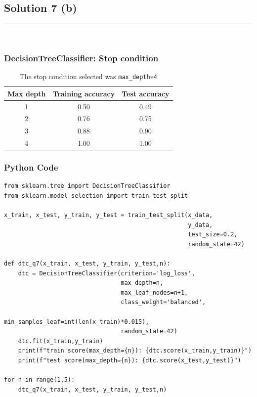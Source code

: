 \documentclass{article}
\begin{document}
\newpage

\subsection*{Solution 7 (b)}
\noindent\rule{\textwidth}{0.4pt}\\

\subsubsection*{DecisionTreeClassifier: Stop condition}
\begin{table}[h!]               
  \centering                    
  \begin{tabular}{|c|c|c|}
    \hline
    Max depth & Training accuracy & Test accuracy \\ \hline
    1 & 0.50 & 0.49 \\ 
    2 & 0.76 & 0.75 \\ 
    3 & 0.88 & 0.90 \\ 
    4 & 1.00 & 1.00 \\ \hline
  \end{tabular}
  \caption{The stop condition selected was \texttt{max\_depth=4}}   
  \label{tab:depth_accuracy}
\end{table}

\subsubsection*{Python Code}
\begin{lstlisting}
from sklearn.tree import DecisionTreeClassifier
from sklearn.model_selection import train_test_split

x_train, x_test, y_train, y_test = train_test_split(x_data,
                                                    y_data,
                                                    test_size=0.2,
                                                    random_state=42)

def dtc_q7(x_train, x_test, y_train, y_test,n):
    dtc = DecisionTreeClassifier(criterion='log_loss',
                                 max_depth=n,
                                 max_leaf_nodes=n+1,
                                 class_weight='balanced',
                                 min_samples_leaf=int(len(x_train)*0.015),
                                 random_state=42)
    dtc.fit(x_train,y_train)
    print(f"train score(max_depth={n}): {dtc.score(x_train,y_train)}")
    print(f"test score(max_depth={n}): {dtc.score(x_test,y_test)}")

for n in range(1,5):
    dtc_q7(x_train, x_test, y_train, y_test,n)
\end{lstlisting}
\end{document}
